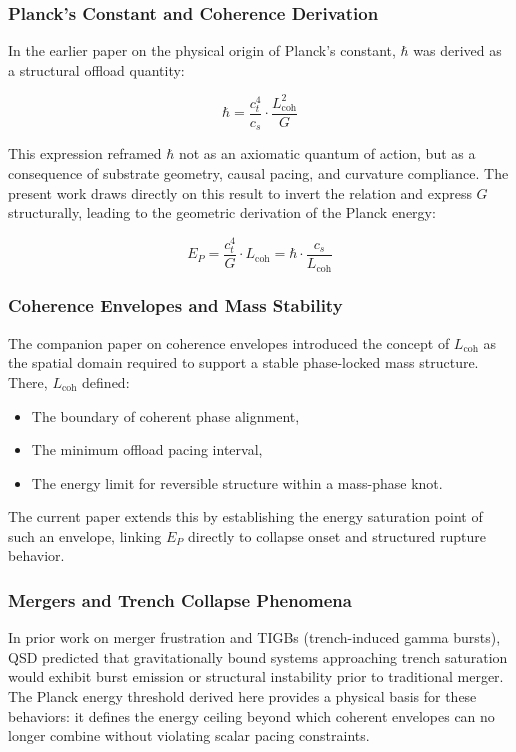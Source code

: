 \documentclass[entropy,article,submit,pdftex,moreauthors]{Definitions/mdpi}
\begin{document}
\subsubsection{Planck’s Constant and Coherence Derivation}
In the earlier paper on the physical origin of Planck’s constant, $\hbar$ was derived as a structural offload quantity:

\begin{equation}
\hbar = \frac{c_t^4}{c_s} \cdot \frac{L_{\text{coh}}^2}{G}
\end{equation}

This expression reframed $\hbar$ not as an axiomatic quantum of action, but as a consequence of substrate geometry, causal pacing, and curvature compliance. The present work draws directly on this result to invert the relation and express $G$ structurally, leading to the geometric derivation of the Planck energy:

\begin{equation}
E_P = \frac{c_t^4}{G} \cdot L_{\text{coh}} = \hbar \cdot \frac{c_s}{L_{\text{coh}}}
\end{equation}

\subsubsection{Coherence Envelopes and Mass Stability}
The companion paper on coherence envelopes introduced the concept of $L_{\text{coh}}$ as the spatial domain required to support a stable phase-locked mass structure. There, $L_{\text{coh}}$ defined:
\begin{itemize}
  \item The boundary of coherent phase alignment,
  \item The minimum offload pacing interval,
  \item The energy limit for reversible structure within a mass-phase knot.
\end{itemize}

The current paper extends this by establishing the energy saturation point of such an envelope, linking $E_P$ directly to collapse onset and structured rupture behavior.

\subsubsection{Mergers and Trench Collapse Phenomena}

In prior work on merger frustration and TIGBs (trench-induced gamma bursts), QSD predicted that gravitationally bound systems approaching trench saturation would exhibit burst emission or structural instability prior to traditional merger. The Planck energy threshold derived here provides a physical basis for these behaviors: it defines the energy ceiling beyond which coherent envelopes can no longer combine without violating scalar pacing constraints.
\end{document}
